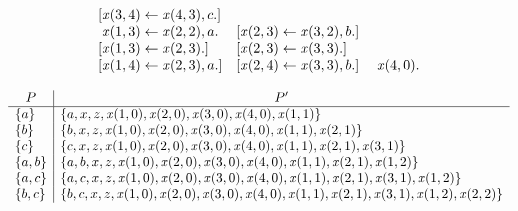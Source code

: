 \begin{Loesung}
\begin{UList}
\begin{equation*}
\begin{array}[t]{r@{{}\leftarrow{}}l@{\qquad}r@{{}\leftarrow{}}l@{\quad}r@{{}\leftarrow{}}l@{\quad}r@{{}\leftarrow{}}l}
[\mathit{x}(3,4) & \mathit{x}(4,3), c.]
\\
\multicolumn{3}{r@{{}\leftarrow{}}}{\mathit{x}(1,3)} & \mathit{x}(2,2),a.
& 
[\mathit{x}(2,3) & \mathit{x}(3,2),b.]
\\
\multicolumn{3}{r@{{}\leftarrow{}}}{[\mathit{x}(1,3)} & \mathit{x}(2,3).]
&
[\mathit{x}(2,3) & \mathit{x}(3,3).]
&
\multicolumn{2}{@{}l}{\phantom{[}\phantom{\mathit{x}(4,0).}}
\\
\multicolumn{3}{r@{{}\leftarrow{}}}{[\mathit{x}(1,4)} & \mathit{x}(2,3),a.]
&
[\mathit{x}(2,4) & \mathit{x}(3,3),b.]
&
\multicolumn{2}{@{}l}{\phantom{[}\mathit{x}(4,0).}
\end{array}
\end{equation*}
\item
\begin{equation*}
\begin{array}{l|l}
\multicolumn{1}{c|}{P} & \multicolumn{1}{c}{P'}
\\\hline
\{a\}
&
\{a,x,z,\mathit{x}(1,0),\mathit{x}(2,0),\mathit{x}(3,0),\mathit{x}(4,0),\mathit{x}(1,1)\}
\\
\{b\}
&
\{b,x,z,\mathit{x}(1,0),\mathit{x}(2,0),\mathit{x}(3,0),\mathit{x}(4,0),\mathit{x}(1,1),\mathit{x}(2,1)\}
\\
\{c\}
&
\{c,x,z,\mathit{x}(1,0),\mathit{x}(2,0),\mathit{x}(3,0),\mathit{x}(4,0),\mathit{x}(1,1),\mathit{x}(2,1),\mathit{x}(3,1)\}
\\
\{a,b\}
&
\{a,b,x,z,\mathit{x}(1,0),\mathit{x}(2,0),\mathit{x}(3,0),\mathit{x}(4,0),\mathit{x}(1,1),\mathit{x}(2,1),\mathit{x}(1,2)\}
\\
\{a,c\}
&
\{a,c,x,z,\mathit{x}(1,0),\mathit{x}(2,0),\mathit{x}(3,0),\mathit{x}(4,0),\mathit{x}(1,1),\mathit{x}(2,1),\mathit{x}(3,1),\mathit{x}(1,2)\}
\\
\{b,c\}
&
\{b,c,x,z,\mathit{x}(1,0),\mathit{x}(2,0),\mathit{x}(3,0),\mathit{x}(4,0),\mathit{x}(1,1),\mathit{x}(2,1),\mathit{x}(3,1),\mathit{x}(1,2),\mathit{x}(2,2)\}
\end{array}
\end{equation*}
\end{UList}
\newpage
\end{Loesung}


